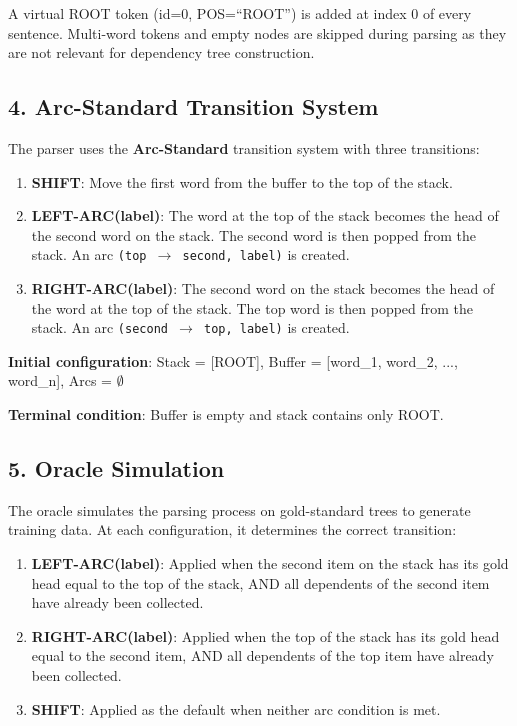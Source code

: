 \documentclass[11pt,a4paper]{article}
\begin{document}
A virtual ROOT token (id=0, POS=``ROOT'') is added at index 0 of every sentence. Multi-word tokens and empty nodes are skipped during parsing as they are not relevant for dependency tree construction.

\subsection*{4. Arc-Standard Transition System}

The parser uses the \textbf{Arc-Standard} transition system with three transitions:

\begin{enumerate}
\item \textbf{SHIFT}: Move the first word from the buffer to the top of the stack.
\item \textbf{LEFT-ARC(label)}: The word at the top of the stack becomes the head of the second word on the stack. The second word is then popped from the stack. An arc \texttt{(top $\rightarrow$ second, label)} is created.
\item \textbf{RIGHT-ARC(label)}: The second word on the stack becomes the head of the word at the top of the stack. The top word is then popped from the stack. An arc \texttt{(second $\rightarrow$ top, label)} is created.
\end{enumerate}

\textbf{Initial configuration}: Stack = [ROOT], Buffer = [word\_1, word\_2, ..., word\_n], Arcs = $\emptyset$

\textbf{Terminal condition}: Buffer is empty and stack contains only ROOT.

\subsection*{5. Oracle Simulation}

The oracle simulates the parsing process on gold-standard trees to generate training data. At each configuration, it determines the correct transition:

\begin{enumerate}
\item \textbf{LEFT-ARC(label)}: Applied when the second item on the stack has its gold head equal to the top of the stack, AND all dependents of the second item have already been collected.
\item \textbf{RIGHT-ARC(label)}: Applied when the top of the stack has its gold head equal to the second item, AND all dependents of the top item have already been collected.
\item \textbf{SHIFT}: Applied as the default when neither arc condition is met.
\end{enumerate}
\end{document}
